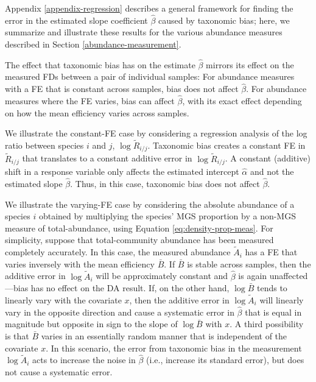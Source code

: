 \documentclass[
]{article}
\begin{document}
Appendix \ref{appendix-regression} describes a general framework for finding the error in the estimated slope coefficient \(\hat \beta\) caused by taxonomic bias; here, we summarize and illustrate these results for the various abundance measures described in Section \ref{abundance-measurement}.

The effect that taxonomic bias has on the estimate \(\hat \beta\) mirrors its effect on the measured FDs between a pair of individual samples:
For abundance measures with a FE that is constant across samples, bias does not affect \(\hat \beta\).
For abundance measures where the FE varies, bias can affect \(\hat \beta\), with its exact effect depending on how the mean efficiency varies across samples.

We illustrate the constant-FE case by considering a regression analysis of the log ratio between species \(i\) and \(j\), \(\log \tilde R_{i/j}\).
Taxonomic bias creates a constant FE in \(\tilde R_{i/j}\) that translates to a constant additive error in \(\log \tilde R_{i/j}\).
A constant (additive) shift in a response variable only affects the estimated intercept \(\hat \alpha\) and not the estimated slope \(\hat \beta\).
Thus, in this case, taxonomic bias does not affect \(\hat \beta\).

We illustrate the varying-FE case by considering the absolute abundance of a species \(i\) obtained by multiplying the species' MGS proportion by a non-MGS measure of total-abundance, using Equation \eqref{eq:density-prop-meas}.
For simplicity, suppose that total-community abundance has been measured completely accurately.
In this case, the measured abundance \(\tilde A_i\) has a FE that varies inversely with the mean efficiency \(\bar B\).
If \(\bar B\) is stable across samples, then the additive error in \(\log \tilde A_i\) will be approximately constant and \(\hat \beta\) is again unaffected---bias has no effect on the DA result.
If, on the other hand, \(\log \bar B\) tends to linearly vary with the covariate \(x\), then the additive error in \(\log \tilde A_i\) will linearly vary in the opposite direction and cause a systematic error in \(\hat \beta\) that is equal in magnitude but opposite in sign to the slope of \(\log \bar B\) with \(x\).
A third possibility is that \(\bar B\) varies in an essentially random manner that is independent of the covariate \(x\).
In this scenario, the error from taxonomic bias in the measurement \(\log \tilde A_{i}\) acts to increase the noise in \(\hat \beta\) (i.e., increase its standard error), but does not cause a systematic error.
\end{document}
